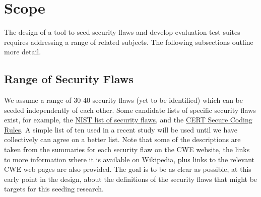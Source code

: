 \section{Scope}

The design of a tool to seed security flaws and develop evaluation test suites requires
addressing a range of related subjects.  The following subsections outline more detail.
\subsection{Range of Security Flaws}
         We assume a range of 30-40 security flaws (yet to be identified)
         which can be seeded independently of each other.  Some candidate lists of
         specific security flaws exist,
         for example, the \href{http://nvd.nist.gov/cwe.cfm}{NIST list of security flaws}, 
         and the 
         \href{https://www.securecoding.cert.org/confluence/display/seccode/CERT+Secure+Coding+Standards}{CERT Secure Coding Rules}.
         A simple list of ten used in a recent study will be used until we have
         collectively can agree on a better list. Note that some of the descriptions
         are taken from the summaries for each security flaw on the CWE website, the 
         links to more information where it is available on Wikipedia, plus
         links to the relevant CWE web pages are also provided.  The goal is to be
         as clear as possible, at this early point in the design, about the definitions of
         the security flaws that might be targets for this seeding research.
